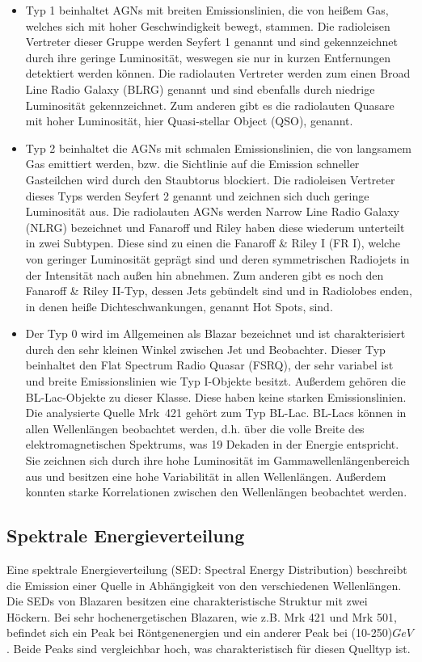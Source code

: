 \begin{itemize}
 \item Typ 1 beinhaltet AGNs mit breiten Emissionslinien, die von heißem Gas, welches sich mit hoher Geschwindigkeit bewegt, stammen.
 Die radioleisen Vertreter dieser Gruppe werden Seyfert 1 genannt und sind gekennzeichnet durch ihre geringe Luminosität, weswegen sie nur in kurzen Entfernungen detektiert werden können.
 Die radiolauten Vertreter werden zum einen Broad Line Radio Galaxy (BLRG) genannt und sind ebenfalls durch niedrige Luminosität gekennzeichnet. 
 Zum anderen gibt es die radiolauten Quasare mit hoher Luminosität, hier Quasi-stellar Object (QSO), genannt.
 \item Typ 2 beinhaltet die AGNs mit schmalen Emissionslinien, die von langsamem Gas emittiert werden, bzw. die Sichtlinie auf die Emission schneller Gasteilchen wird durch den Staubtorus blockiert.
 Die radioleisen Vertreter dieses Typs werden Seyfert 2 genannt und zeichnen sich duch geringe Luminosität aus.
 Die radiolauten AGNs werden Narrow Line Radio Galaxy (NLRG) bezeichnet und Fanaroff und Riley haben diese wiederum unterteilt in zwei Subtypen.
 Diese sind zu einen die Fanaroff \& Riley I (FR I), welche von geringer Luminosität geprägt sind und deren symmetrischen Radiojets in der Intensität nach außen hin abnehmen.
 Zum anderen gibt es noch den Fanaroff \& Riley II-Typ, dessen Jets gebündelt sind und in Radiolobes enden, in denen heiße Dichteschwankungen, genannt Hot Spots, sind.
 \item Der Typ 0 wird im Allgemeinen als Blazar bezeichnet und ist charakterisiert durch den sehr kleinen Winkel zwischen Jet und Beobachter.
 Dieser Typ beinhaltet den Flat Spectrum Radio Quasar (FSRQ), der sehr variabel ist und breite Emissionslinien wie Typ I-Objekte besitzt.
 Außerdem gehören die BL-Lac-Objekte zu dieser Klasse. Diese haben keine starken Emissionslinien.
 Die analysierte Quelle Mrk~421 gehört zum Typ BL-Lac.
 BL-Lacs können in allen Wellenlängen beobachtet werden, d.h. über die volle Breite des elektromagnetischen Spektrums, was 19 Dekaden in der Energie entspricht.
 Sie zeichnen sich durch ihre hohe Luminosität im Gammawellenlängenbereich aus und besitzen eine hohe Variabilität in allen Wellenlängen.
 Außerdem konnten starke Korrelationen zwischen den Wellenlängen beobachtet werden.
\end{itemize}


\subsection{Spektrale Energieverteilung}
Eine spektrale Energieverteilung (SED: Spectral Energy Distribution) beschreibt die Emission einer Quelle in Abhängigkeit von den verschiedenen Wellenlängen.
Die SEDs von Blazaren besitzen eine charakteristische Struktur mit zwei Höckern.
Bei sehr hochenergetischen Blazaren, wie z.B. Mrk 421 und Mrk 501, befindet sich ein Peak bei Röntgenenergien und ein anderer Peak bei (10-250)$\si{GeV}$.
Beide Peaks sind vergleichbar hoch, was charakteristisch für diesen Quelltyp ist.\cite{Weekes}


